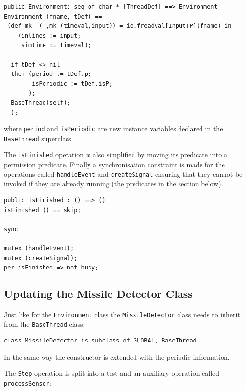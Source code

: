 \documentclass{overturerepchap}
\begin{document}
\begin{lstlisting}
public Environment: seq of char * [ThreadDef] ==> Environment
Environment (fname, tDef) ==
 (def mk_ (-,mk_(timeval,input)) = io.freadval[InputTP](fname) in
    (inlines := input;
     simtime := timeval);
     
  if tDef <> nil
  then (period := tDef.p;
        isPeriodic := tDef.isP;
       );
  BaseThread(self);
  );
\end{lstlisting}
\noindent where \texttt{period} and \texttt{isPeriodic} are new instance
variables declared in the \texttt{BaseThread} superclass.

The \texttt{isFinished} operation is also simplified by moving its
predicate into a permission predicate. Finally a synchronisation
constraint is made for the operations called
\texttt{handleEvent} and \texttt{createSignal}
ensuring that they cannot be invoked if they
are already running (the {\bf{}} predicates in the
{\bf{}} 
section below).

\begin{lstlisting}
public isFinished : () ==> ()
isFinished () == skip;

sync

mutex (handleEvent);
mutex (createSignal);
per isFinished => not busy;
\end{lstlisting}

\subsection{Updating the Missile Detector Class}

Just like for the \texttt{Environment} class the \texttt{MissileDetector} 
class needs to inherit from the \texttt{BaseThread} class:

\begin{lstlisting}
class MissileDetector is subclass of GLOBAL, BaseThread
\end{lstlisting}
\noindent In the same way the constructor is extended with the periodic
information.
%

The \texttt{Step} operation is split into a test and an auxiliary operation
called \texttt{processSensor}:
\end{document}
